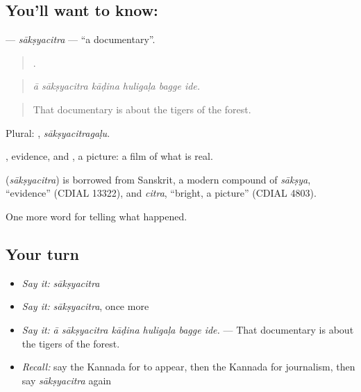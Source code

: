 \subsection*{You'll want to know: }
\textbf{} — \emph{sākṣyacitra} — \textquotedblleft{}a documentary\textquotedblright{}.

\begin{quote}
     .
\end{quote}

\begin{quote}
\emph{ā sākṣyacitra kāḍina huligaḷa bagge ide.}
\end{quote}

\begin{quote}
That documentary is about the tigers of the forest.
\end{quote}

Plural: , \emph{sākṣyacitragaḷu}.

, evidence, and , a picture: a film of what is real.

\begin{cousinweb}
\textbf{} (\emph{sākṣyacitra}) is borrowed from Sanskrit, a modern compound of \emph{sākṣya}, \textquotedblleft{}evidence\textquotedblright{} (CDIAL 13322), and \emph{citra}, \textquotedblleft{}bright, a picture\textquotedblright{} (CDIAL 4803).
\end{cousinweb}

\begin{grammarlens}[title={What you've built}]
One more word for telling what happened.
\end{grammarlens}

\subsection*{Your turn}
\begin{itemize}
\raggedright
  \item \emph{Say it:} \emph{sākṣyacitra}
  \item \emph{Say it:} \emph{sākṣyacitra}, once more
  \item \emph{Say it:} \emph{ā sākṣyacitra kāḍina huligaḷa bagge ide.} — That documentary is about the tigers of the forest.
  \item \emph{Recall:} say the Kannada for to appear, then the Kannada for journalism, then say \emph{sākṣyacitra} again
\end{itemize}

